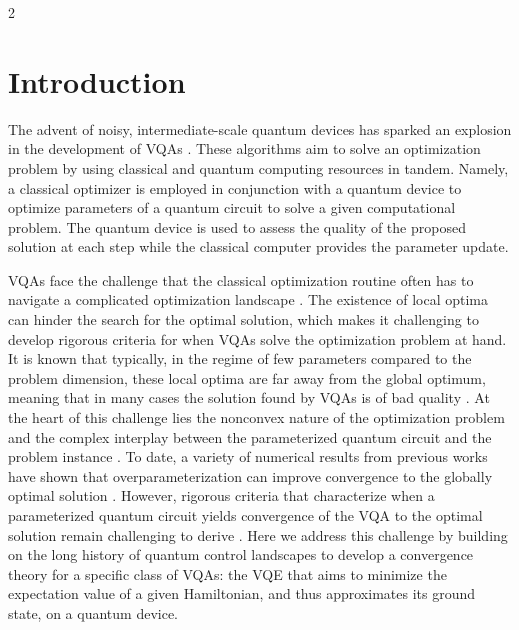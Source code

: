\documentclass{article}
\begin{document}
\begin{multicols}{2}

\section{Introduction}
The advent of noisy, intermediate-scale quantum devices has sparked an explosion in the development of \glspl{VQA} \cite{cerezo_variational_2021}. These algorithms aim to solve an optimization problem by using classical and quantum computing resources in tandem. Namely, a classical optimizer is employed in conjunction with a quantum device to optimize parameters of a quantum circuit to solve a given computational problem. The quantum device is used to assess the quality of the proposed solution at each step while the classical computer provides the parameter update. 

VQAs face the challenge that the classical optimization routine often has to navigate a complicated optimization landscape \cite{VQA_traps, PhysRevLett.127.120502}. The existence of local optima can hinder the search for the optimal solution, which makes it challenging to develop rigorous criteria for when VQAs solve the optimization problem at hand.
It is known that typically, in the regime of few parameters compared to the problem dimension, these local optima are far away from the global optimum, meaning that in many cases the solution found by VQAs is of bad quality \cite{VQA_traps, anschuetz_critical_2021}.
At the heart of this challenge lies the nonconvex nature of the optimization problem and the complex interplay between the parameterized quantum circuit and the problem instance \cite{lee_progress_2021}. To date, a variety of numerical results from previous works have shown that overparameterization can improve convergence to the globally optimal solution \cite{kiani_learning_2020, PRXQuantum.1.020319,larocca_theory_2023,lee_progress_2021,you_convergence_2022}.
However, rigorous criteria that characterize when a parameterized quantum circuit yields convergence of the VQA to the optimal solution remain challenging to derive \cite{you_convergence_2022}. Here we address this challenge by building on the long history of quantum control landscapes \cite{Chakrabarti01102007,GE2022314} to develop a convergence theory for a specific class of VQAs: the \gls{VQE} \cite{TILLY20221} that aims to minimize the expectation value of a given Hamiltonian, and thus approximates its ground state, on a quantum device.


\end{multicols}
\end{document}
